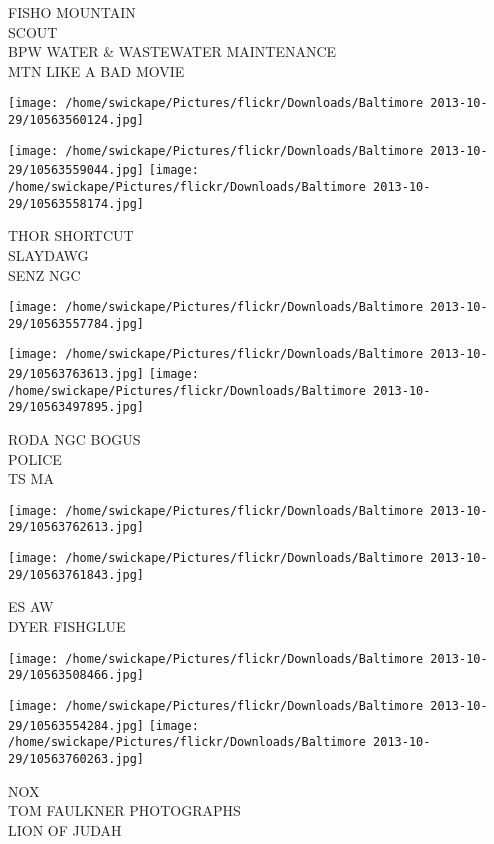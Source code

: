 \documentclass[10pt,letterpaper]{article}
\begin{document}
FISHO MOUNTAIN\\
SCOUT\\
BPW WATER \& WASTEWATER MAINTENANCE\\
MTN LIKE A BAD MOVIE
\pagebreak

\texttt{[image: /home/swickape/Pictures/flickr/Downloads/Baltimore 2013-10-29/10563560124.jpg]}

\vspace{0.25in}
\texttt{[image: /home/swickape/Pictures/flickr/Downloads/Baltimore 2013-10-29/10563559044.jpg]}
\texttt{[image: /home/swickape/Pictures/flickr/Downloads/Baltimore 2013-10-29/10563558174.jpg]}

THOR SHORTCUT\\
SLAYDAWG\\
SENZ NGC
\pagebreak

\texttt{[image: /home/swickape/Pictures/flickr/Downloads/Baltimore 2013-10-29/10563557784.jpg]}

\vspace{0.25in}
\texttt{[image: /home/swickape/Pictures/flickr/Downloads/Baltimore 2013-10-29/10563763613.jpg]}
\texttt{[image: /home/swickape/Pictures/flickr/Downloads/Baltimore 2013-10-29/10563497895.jpg]}

RODA NGC BOGUS\\
POLICE\\
TS MA
\pagebreak

\texttt{[image: /home/swickape/Pictures/flickr/Downloads/Baltimore 2013-10-29/10563762613.jpg]}

\vspace{0.25in}
\texttt{[image: /home/swickape/Pictures/flickr/Downloads/Baltimore 2013-10-29/10563761843.jpg]}

ES AW\\
DYER FISHGLUE
\pagebreak

\texttt{[image: /home/swickape/Pictures/flickr/Downloads/Baltimore 2013-10-29/10563508466.jpg]}

\vspace{0.25in}
\texttt{[image: /home/swickape/Pictures/flickr/Downloads/Baltimore 2013-10-29/10563554284.jpg]}
\texttt{[image: /home/swickape/Pictures/flickr/Downloads/Baltimore 2013-10-29/10563760263.jpg]}

NOX\\
TOM FAULKNER PHOTOGRAPHS\\
LION OF JUDAH
\pagebreak
\end{document}

